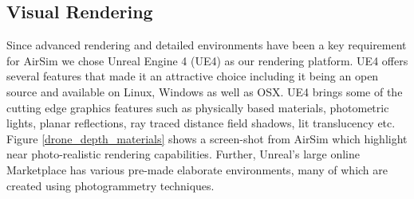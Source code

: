 \documentclass[graybox]{svmult}
\begin{document}
\subsection{Visual Rendering}

Since advanced rendering and detailed environments have been a key requirement for AirSim we chose Unreal Engine 4 (UE4) \cite{karis2013real} as our rendering platform. UE4 offers several features that made it an attractive choice including it being an open source and available on Linux, Windows as well as OSX. UE4 brings some of the cutting edge graphics features such as physically based materials, photometric lights, planar reflections, ray traced distance field shadows, lit translucency etc. Figure \ref{drone_depth_materials} shows a screen-shot from AirSim which highlight near photo-realistic rendering capabilities. Further, Unreal's large online Marketplace has various pre-made elaborate environments, many of which are created using photogrammetry techniques.

\end{document}
